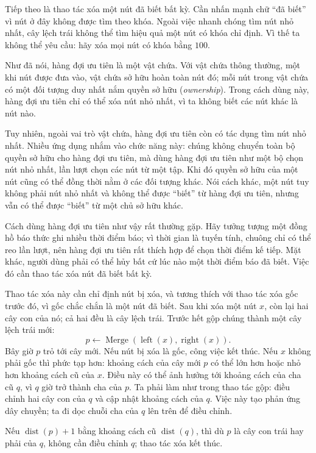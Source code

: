 \documentclass[11pt]{article}
\begin{document}
Tiếp theo là thao tác xóa một nút đã biết bất kỳ. Cần nhấn mạnh chữ ``đã biết''
vì nút ở đây không được tìm theo khóa. Ngoài việc nhanh chóng tìm nút nhỏ nhất,
cây lệch trái không thể tìm hiệu quả một nút có khóa chỉ định. Vì thế ta không
thể yêu cầu: hãy xóa mọi nút có khóa bằng \(100\).

Như đã nói, hàng đợi ưu tiên là một vật chứa. Với vật chứa thông thường, một khi
nút được đưa vào, vật chứa sở hữu hoàn toàn nút đó; mỗi nút trong vật chứa có
một đối tượng duy nhất nắm quyền sở hữu (\emph{ownership}). Trong cách dùng này,
hàng đợi ưu tiên chỉ có thể xóa nút nhỏ nhất, vì ta không biết các nút khác là
nút nào.

Tuy nhiên, ngoài vai trò vật chứa, hàng đợi ưu tiên còn có tác dụng tìm nút nhỏ
nhất. Nhiều ứng dụng nhắm vào chức năng này: chúng không chuyển toàn bộ quyền
sở hữu cho hàng đợi ưu tiên, mà dùng hàng đợi ưu tiên như một bộ chọn nút nhỏ
nhất, lần lượt chọn các nút từ một tập. Khi đó quyền sở hữu của một nút cũng có
thể đồng thời nằm ở các đối tượng khác. Nói cách khác, một nút tuy không phải
nút nhỏ nhất và không thể được ``biết'' từ hàng đợi ưu tiên, nhưng vẫn có thể
được ``biết'' từ một chủ sở hữu khác.

Cách dùng hàng đợi ưu tiên như vậy rất thường gặp. Hãy tưởng tượng một đồng hồ
báo thức ghi nhiều thời điểm báo; vì thời gian là tuyến tính, chuông chỉ có thể
reo lần lượt, nên hàng đợi ưu tiên rất thích hợp để chọn thời điểm kế tiếp. Mặt
khác, người dùng phải có thể hủy bất cứ lúc nào một thời điểm báo đã biết. Việc
đó cần thao tác xóa nút đã biết bất kỳ.

Thao tác xóa này cần chỉ định nút bị xóa, và tương thích với thao tác xóa gốc
trước đó, vì gốc chắc chắn là một nút đã biết. Sau khi xóa một nút \(x\), còn
lại hai cây con của nó; cả hai đều là cây lệch trái. Trước hết gộp chúng thành
một cây lệch trái mới:
\[
  p \gets \operatorname{Merge}(\operatorname{left}(x),\operatorname{right}(x)).
\]
Bây giờ \(p\) trỏ tới cây mới. Nếu nút bị xóa là gốc, công việc kết thúc. Nếu
\(x\) không phải gốc thì phức tạp hơn: khoảng cách của cây mới \(p\) có thể lớn
hơn hoặc nhỏ hơn khoảng cách cũ của \(x\). Điều này có thể ảnh hưởng tới khoảng
cách của cha cũ \(q\), vì \(q\) giờ trở thành cha của \(p\). Ta phải làm như
trong thao tác gộp: điều chỉnh hai cây con của \(q\) và cập nhật khoảng cách
của \(q\). Việc này tạo phản ứng dây chuyền; ta đi dọc chuỗi cha của \(q\) lên
trên để điều chỉnh.

Nếu \(\operatorname{dist}(p)+1\) bằng khoảng cách cũ \(\operatorname{dist}(q)\),
thì dù \(p\) là cây con trái hay phải của \(q\), không cần điều chỉnh \(q\);
thao tác xóa kết thúc.
\end{document}
